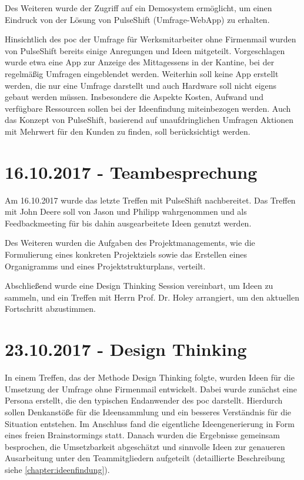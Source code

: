 Des Weiteren wurde der Zugriff auf ein Demosystem ermöglicht, um einen Eindruck von der Lösung von PulseShift (Umfrage-WebApp) zu erhalten.

Hinsichtlich des \gls{poc} der Umfrage für Werksmitarbeiter ohne Firmenmail wurden von PulseShift bereits einige Anregungen und Ideen mitgeteilt. Vorgeschlagen wurde etwa eine App zur Anzeige des Mittagessens in der Kantine, bei der regelmäßig Umfragen eingeblendet werden. Weiterhin soll keine App erstellt werden, die nur eine Umfrage darstellt und auch Hardware soll nicht eigens gebaut werden müssen. Insbesondere die Aspekte Kosten, Aufwand und verfügbare Ressourcen sollen bei der Ideenfindung miteinbezogen werden. Auch das Konzept von PulseShift, basierend auf unaufdringlichen Umfragen Aktionen mit Mehrwert für den Kunden zu finden, soll berücksichtigt werden.

\section{16.10.2017 - Teambesprechung}
Am 16.10.2017 wurde das letzte Treffen mit PulseShift nachbereitet. Das Treffen mit John Deere soll von Jason und Philipp wahrgenommen und als Feedbackmeeting für bis dahin ausgearbeitete Ideen genutzt werden.

Des Weiteren wurden die Aufgaben des Projektmanagements, wie die Formulierung eines konkreten Projektziels sowie das Erstellen eines Organigramms und eines Projektstrukturplans, verteilt.

Abschließend wurde eine Design Thinking Session vereinbart, um Ideen zu sammeln, und ein Treffen mit Herrn Prof. Dr. Holey arrangiert, um den aktuellen Fortschritt abzustimmen.

\section{23.10.2017 - Design Thinking}
In einem Treffen, das der Methode Design Thinking folgte, wurden Ideen für die Umsetzung der Umfrage ohne Firmenmail entwickelt. Dabei wurde zunächst eine Persona erstellt, die den typischen Endanwender des \gls{poc} darstellt. Hierdurch sollen Denkanstöße für die Ideensammlung und ein besseres Verständnis für die Situation entstehen. Im Anschluss fand die eigentliche Ideengenerierung in Form eines freien Brainstormings statt. Danach wurden die Ergebnisse gemeinsam besprochen, die Umsetzbarkeit abgeschätzt und sinnvolle Ideen zur genaueren Ausarbeitung unter den Teammitgliedern aufgeteilt (detaillierte Beschreibung siehe \vref{chapter:ideenfindung}).

